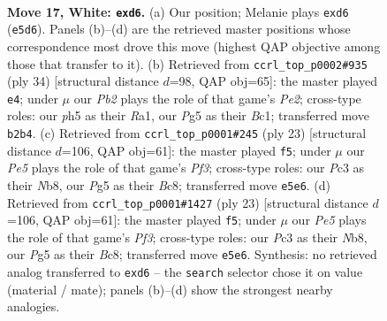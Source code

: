 \documentclass[11pt]{article}
\begin{document}
\clearpage

\begin{figure}[p]\centering
\begin{subfigure}{0.46\textwidth}\centering
\resizebox{\linewidth}{!}{%
\newchessgame
\chessboard[
  setfen={2r1kbnr/pb3pp1/1q6/2ppP1Pp/2p2P1P/2P4R/PP3Q2/RNB1K2B w Qk d6 0 17},
  showmover=false,
  pgfstyle=straightmove, color=movearrow, markmove={e5-d6}
]}
\caption{}
\end{subfigure}\hfill
\begin{subfigure}{0.46\textwidth}\centering
\resizebox{\linewidth}{!}{%
\newchessgame
\chessboard[
  setfen={r1bqr1k1/1p3pp1/1p5p/pPb5/P2p3P/3P2P1/4PPB1/R1BQR1K1 w - - 1 18},
  showmover=false,
  pgfstyle=straightmove, color=movearrow, markmove={e2-e4}
]}
\caption{}
\end{subfigure}
\\[4pt]
\begin{subfigure}{0.46\textwidth}\centering
\resizebox{\linewidth}{!}{%
\newchessgame
\chessboard[
  setfen={rnbq1rk1/1pp3pp/1b1p1p2/p2P4/3P4/P3BN2/1PQ2PPP/R3KB1R b KQ - 3 12},
  showmover=false,
  pgfstyle=straightmove, color=movearrow, markmove={f6-f5}
]}
\caption{}
\end{subfigure}\hfill
\begin{subfigure}{0.46\textwidth}\centering
\resizebox{\linewidth}{!}{%
\newchessgame
\chessboard[
  setfen={rnbq1rk1/1pp3pp/1b1p1p2/p2P4/3P4/P3BN2/1PQ2PPP/R3KB1R b KQ - 3 12},
  showmover=false,
  pgfstyle=straightmove, color=movearrow, markmove={f6-f5}
]}
\caption{}
\end{subfigure}
\caption{\textbf{Move 17, White: \texttt{exd6}.} (a) Our position; Melanie plays \texttt{exd6} (\texttt{e5d6}). Panels (b)--(d) are the retrieved master positions whose correspondence most drove this move (highest QAP objective among those that transfer to it). (b) Retrieved from \texttt{ccrl\_top\_p0002\#935} (ply 34) [structural distance $d$=98, QAP obj=65]: the master played \texttt{e4}; under $\mu$ our \emph{Pb2} plays the role of that game's \emph{Pe2}; cross-type roles: our \emph{p}h5 as their \emph{R}a1, our \emph{P}g5 as their \emph{B}c1; transferred move \texttt{b2b4}. (c) Retrieved from \texttt{ccrl\_top\_p0001\#245} (ply 23) [structural distance $d$=106, QAP obj=61]: the master played \texttt{f5}; under $\mu$ our \emph{Pe5} plays the role of that game's \emph{Pf3}; cross-type roles: our \emph{P}c3 as their \emph{N}b8, our \emph{P}g5 as their \emph{B}c8; transferred move \texttt{e5e6}. (d) Retrieved from \texttt{ccrl\_top\_p0001\#1427} (ply 23) [structural distance $d$=106, QAP obj=61]: the master played \texttt{f5}; under $\mu$ our \emph{Pe5} plays the role of that game's \emph{Pf3}; cross-type roles: our \emph{P}c3 as their \emph{N}b8, our \emph{P}g5 as their \emph{B}c8; transferred move \texttt{e5e6}. Synthesis: no retrieved analog transferred to \texttt{exd6} -- the \texttt{search} selector chose it on value (material / mate); panels (b)--(d) show the strongest nearby analogies.}
\label{fig:thought-m32}
\end{figure}
\end{document}
